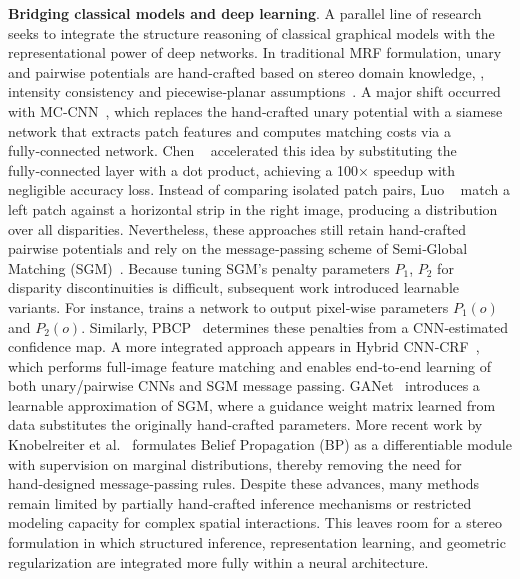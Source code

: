 \noindent\textbf{Bridging classical models and deep learning}. A parallel line of research seeks to integrate the structure reasoning of classical graphical models with the representational power of deep networks. 
In traditional MRF formulation, unary and pairwise potentials are hand-crafted based on stereo domain knowledge, \eg, intensity consistency and piecewise‑planar assumptions~\cite{Taniai18,bleyer2011patchmatch}.
A major shift occurred with MC‑CNN~\cite{zbontar2016stereo}, which replaces the hand‑crafted unary potential with a siamese network that extracts patch features and computes matching costs via a fully‑connected network.
Chen \etal~\cite{chen2015deep} accelerated this idea by substituting the fully‑connected layer with a dot product, achieving a 100× speedup with negligible accuracy loss.
Instead of comparing isolated patch pairs, Luo \etal~\cite{luo2016efficient} match a left patch against a horizontal strip in the right image, producing a distribution over all disparities. Nevertheless, these approaches still retain hand‑crafted pairwise potentials and rely on the message‑passing scheme of Semi‑Global Matching (SGM)~\cite{hirschmuller2007stereo}.
Because tuning SGM’s penalty parameters $P_1$, $P_2$ for disparity discontinuities is difficult, subsequent work introduced learnable variants.
For instance, \cite{seki2017sgm} trains a network to output pixel‑wise parameters $P_1(o)$ and $P_2(o)$. Similarly, PBCP~\cite{seki2016patch} determines these penalties from a CNN‑estimated confidence map. A more integrated approach appears in Hybrid CNN‑CRF~\cite{knobelreiter2017end}, which performs full‑image feature matching and enables end‑to‑end learning of both unary/pairwise CNNs and SGM message passing.
GANet~\cite{Zhang2019GANet} introduces a learnable approximation of SGM, where a guidance weight matrix learned from data substitutes the originally hand‑crafted parameters.
More recent work by Knobelreiter et al.~\cite{knobelreiter2020belief} formulates Belief Propagation (BP) as a differentiable module with supervision on marginal distributions, thereby removing the need for hand‑designed message‑passing rules.
Despite these advances, many methods remain limited by partially hand‑crafted inference mechanisms or restricted modeling capacity for complex spatial interactions.
This leaves room for a stereo formulation in which structured inference, representation learning, and geometric regularization are integrated more fully within a neural architecture.

